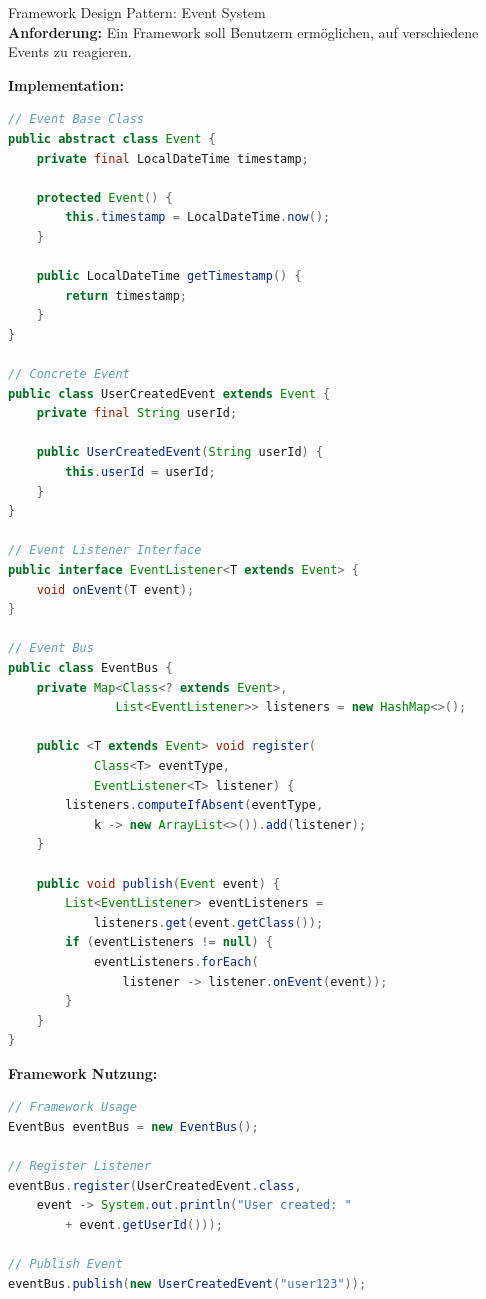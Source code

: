 \begin{example2}{Framework Design Pattern: Event System}\\
\textbf{Anforderung:}
Ein Framework soll Benutzern ermöglichen, auf verschiedene Events zu reagieren.

\textbf{Implementation:}
\begin{lstlisting}[language=Java, style=basesmol]
// Event Base Class
public abstract class Event {
    private final LocalDateTime timestamp;
    
    protected Event() {
        this.timestamp = LocalDateTime.now();
    }
    
    public LocalDateTime getTimestamp() {
        return timestamp;
    }
}

// Concrete Event
public class UserCreatedEvent extends Event {
    private final String userId;
    
    public UserCreatedEvent(String userId) {
        this.userId = userId;
    }
}

// Event Listener Interface
public interface EventListener<T extends Event> {
    void onEvent(T event);
}

// Event Bus
public class EventBus {
    private Map<Class<? extends Event>, 
               List<EventListener>> listeners = new HashMap<>();
    
    public <T extends Event> void register(
            Class<T> eventType, 
            EventListener<T> listener) {
        listeners.computeIfAbsent(eventType, 
            k -> new ArrayList<>()).add(listener);
    }
    
    public void publish(Event event) {
        List<EventListener> eventListeners = 
            listeners.get(event.getClass());
        if (eventListeners != null) {
            eventListeners.forEach(
                listener -> listener.onEvent(event));
        }
    }
}
\end{lstlisting}

\textbf{Framework Nutzung:}
\begin{lstlisting}[language=Java, style=basesmol]
// Framework Usage
EventBus eventBus = new EventBus();

// Register Listener
eventBus.register(UserCreatedEvent.class, 
    event -> System.out.println("User created: " 
        + event.getUserId()));

// Publish Event
eventBus.publish(new UserCreatedEvent("user123"));
\end{lstlisting}
\end{example2}

